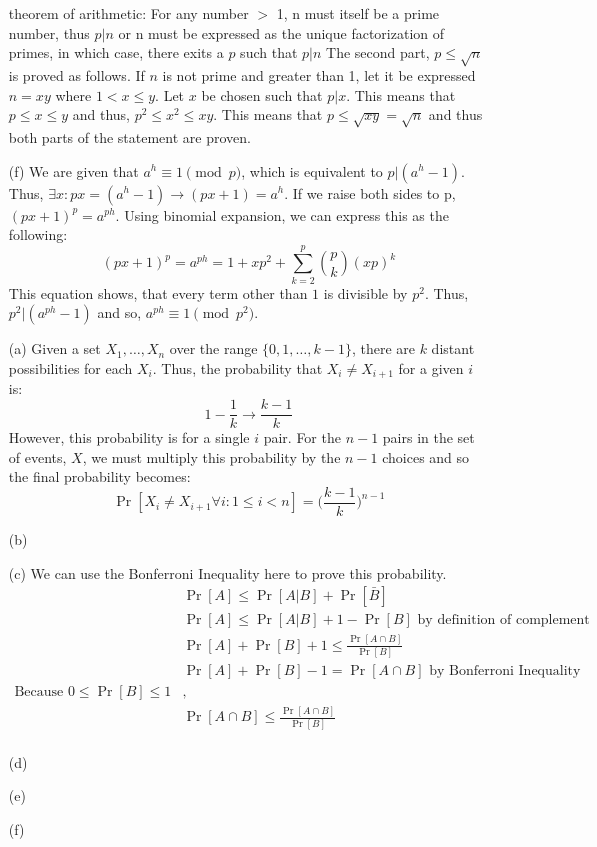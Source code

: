 \documentclass[11pt]{article}
\newcounter{qnum}
\newcommand{\question}[1]{\stepcounter{qnum}\bigskip\noindent{\bf \arabic{qnum}. #1.}}
\begin{document}
\begin{itemize}
    theorem of arithmetic:
    For any number $>$ 1, n must itself be a prime number, thus $p|n$ or n must be expressed
    as the unique factorization of primes, in which case, there exits a $p$ such that $p|n$
    The second part, $p \leq \sqrt{n}$ is proved as follows. If $n$ is not prime and greater
    than 1, let it be expressed $n = xy$ where $1 < x \leq y$. Let $x$ be chosen such that 
    $p | x$. This means that $p \leq x \leq y$ and thus, $p^{2} \leq x^{2}\leq xy$.
    This means that $p \leq \sqrt{xy} = \sqrt{n}$ and thus both parts of the 
    statement are proven.
  \item[(f)] 
    We are given that $a^{h} \equiv 1 \pmod{p}$, which is equivalent to $p | (a^{h} -1)$.
    Thus, $\exists x: px = (a^{h} - 1) \rightarrow (px+1) = a^{h}$. If we raise both sides to 
    p, $(px+1)^{p} = a^{ph}$. Using binomial expansion, we can express this as the following:
    \[
      (px+1)^{p} = a^{ph} = 1 + xp^{2} + \sum_{k=2}^{p} \binom{p}{k} (xp)^{k}
    \]
    This equation shows, that every term other than $1$ is divisible by $p^{2}$. Thus, 
    $ p^{2} | (a^{ph} -1)$ and so, $a^{ph} \equiv 1 \pmod{p^{2}}$.
\end{itemize}

\question{Probability exercises} 
\begin{itemize}
  \item[(a)] 
    Given a set $X_1, \dots, X_n$ over the range $\{0,1,\dots,k-1\}$, there are $k$ distant 
    possibilities for each $X_i$. Thus, the probability that $X_i \neq X_{i+1}$ for a given $i$ is:
    \[
      1 - \frac{1}{k} \rightarrow \frac{k-1}{k}
    \]
    However, this probability is for a single $i$ pair. For the $n-1$ pairs in the set of events, $X$,
    we must multiply this probability by the $n-1$ choices and so the final probability becomes:
    \[
      \Pr[X_i \neq X_{i+1} \forall i: 1\leq i < n] =\Big(\frac{k-1}{k}\Big)^{n-1}
    \]
  \item[(b)]
  \item[(c)] 
    We can use the Bonferroni Inequality \cite{BPS} here to prove this probability. 
      \begin{align}
      & \Pr[A] \leq \Pr[A|B] + \Pr[\bar{B}] \\   
      & \Pr[A] \leq \Pr[A|B] + 1 - \Pr[B] \text{ by definition of complement} \\
      & \Pr[A] + \Pr[B] + 1 \leq \frac{\Pr[A\cap B]}{\Pr[B]} \\
      & \Pr[A] + \Pr[B] -1 = \Pr[A \cap B] \text{ by Bonferroni Inequality} \\
      \text{Because } 0 \leq \Pr[B] \leq 1&, \nonumber \\
      &\Pr[A \cap B] \leq \frac{\Pr[A \cap B]}{\Pr[B]} \\
      \end{align}
       \nonumber
  \item[(d)]
  \item[(e)]
  \item[(f)]
\end{itemize}
\end{document}
